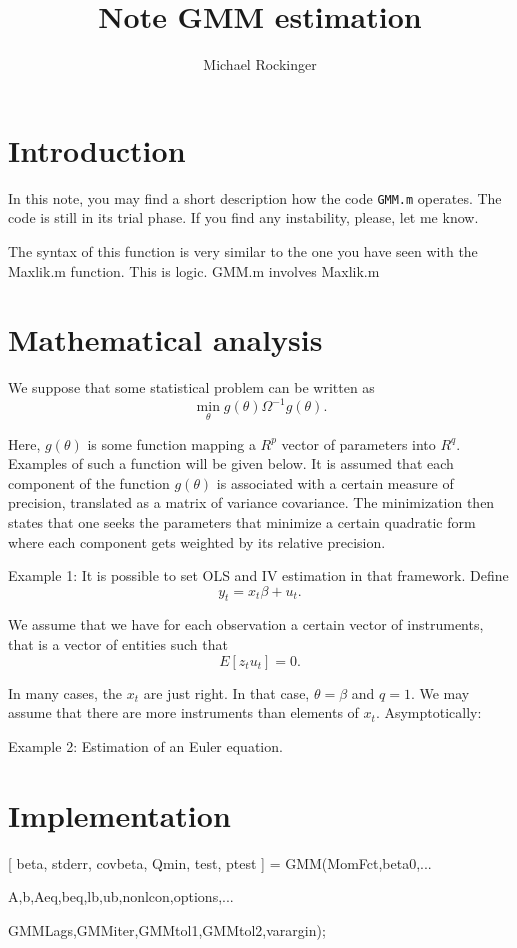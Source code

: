\documentclass[12pt,a4paper]{article}
\begin{document}
\title{Note GMM estimation}
\author{Michael Rockinger}
\maketitle

\section{\protect\bigskip Introduction}

In this note, you may find a short description how the code \texttt{GMM.m}
operates. The code is still in its trial phase. If you find any instability,
please, let me know.

The syntax of this function is very similar to the one you have seen with
the Maxlik.m function. This is logic. GMM.m involves Maxlik.m

\section{Mathematical analysis}

We suppose that some statistical problem can be written as%
\begin{equation*}
\min_{\theta }g(\theta )\Omega ^{-1}g(\theta ).
\end{equation*}

Here, $g(\theta )$ is some function mapping a $R^{p}$ vector of parameters
into $R^{q}.$ Examples of such a function will be given below. It is assumed
that each component of the function $g(\theta )$ is associated with a
certain measure of precision, translated as a matrix of variance covariance.
The minimization then states that one seeks the parameters that minimize a
certain quadratic form where each component gets weighted by its relative
precision.

Example 1: It is possible to set OLS and IV estimation in that framework.
Define%
\begin{equation*}
y_{t}=x_{t}\beta +u_{t}.
\end{equation*}

We assume that we have for each observation a certain vector of instruments,
that is a vector of entities such that 
\begin{equation*}
E[z_{t}u_{t}]=0.
\end{equation*}

In many cases, the $x_{t}$ are just right. In that case, $\theta =\beta $
and $q=1.$ We may assume that there are more instruments than elements of $%
x_{t}.$ Asymptotically:

Example 2: Estimation of an Euler equation.

\section{Implementation}

[ beta, stderr, covbeta, Qmin, test, ptest ] = GMM(MomFct,beta0,...

A,b,Aeq,beq,lb,ub,nonlcon,options,...

GMMLags,GMMiter,GMMtol1,GMMtol2,varargin);

\bigskip
\end{document}

